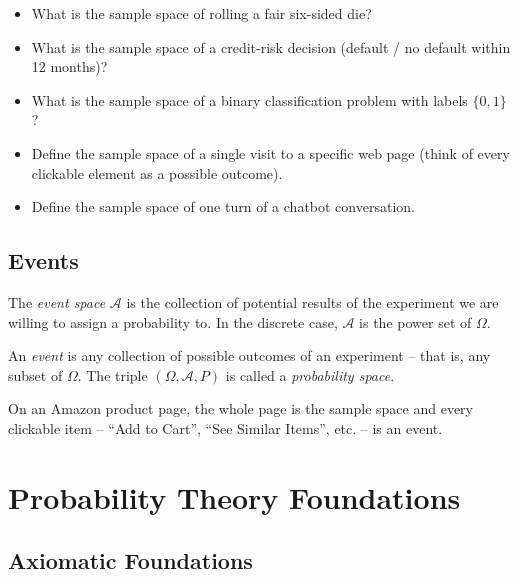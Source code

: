 \documentclass[11pt]{article}
\begin{document}
\begin{tryit}
\begin{itemize}[nosep]
  \item What is the sample space of rolling a fair six-sided die?
  \item What is the sample space of a credit-risk decision (default / no
        default within 12 months)?
  \item What is the sample space of a binary classification problem with
        labels $\{0, 1\}$?
  \item Define the sample space of a single visit to a specific web page
        (think of every clickable element as a possible outcome).
  \item Define the sample space of one turn of a chatbot conversation.
\end{itemize}
\end{tryit}

\subsection{Events}

\begin{definition}
The \emph{event space} $\mathcal{A}$ is the collection of potential results of
the experiment we are willing to assign a probability to. In the discrete
case, $\mathcal{A}$ is the power set of $\Omega$.
\end{definition}

\begin{definition}[Event]
An \emph{event} is any collection of possible outcomes of an experiment --
that is, any subset of $\Omega$. The triple $(\Omega, \mathcal{A}, P)$ is
called a \emph{probability space}.
\end{definition}

\begin{example}
On an Amazon product page, the whole page is the sample space and every
clickable item -- ``Add to Cart'', ``See Similar Items'', etc. -- is an event.
\end{example}

\section{Probability Theory Foundations}

\subsection{Axiomatic Foundations}
\end{document}

